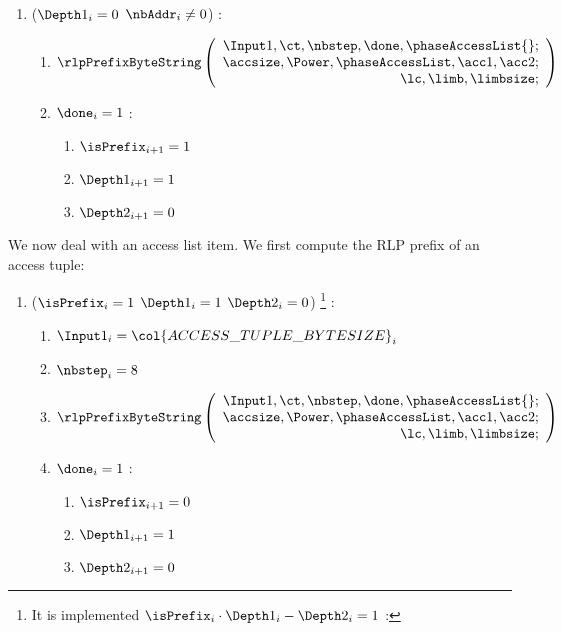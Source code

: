 \begin{enumerate}[resume]
	\item \If ($\Depth 1_{i}=0$ \et $\nbAddr_{i} \neq 0$) \Then:
		\begin{enumerate}
			\item 
				\[
					\rlpPrefixByteString
					\left( \begin{array}{r}
						\Input1,
						\ct,
						\nbstep,
						\done,
						\phaseAccessList{}; \\
						\accsize,
						\Power,
						\phaseAccessList,
						\acc1,
						\acc2; \\
						\lc,
						\limb,
						\limbsize; \\
					\end{array} \right)
				\]
			\item \If $\done_{i}=1$ \Then:
				\begin{enumerate} 
					\item $\isPrefix_{i+1}=1$
					\item $\Depth1_{i+1}=1$
					\item $\Depth2_{i+1}=0$	
				\end{enumerate}
		\end{enumerate}
\end{enumerate}
We now deal with an access list item. We first compute the RLP prefix of an access tuple:
\begin{enumerate}[resume]
	\item \If ($\isPrefix_{i}=1$ \et $\Depth1_{i}=1$ \et $\Depth2_{i}=0$) \footnote{It is implemented \If $\isPrefix_{i} \cdot \Depth1_{i} - \Depth2_{i}=1$ \Then:} \Then:
		\begin{enumerate}
			\item $\Input1_{i} = \col{ACCESS\_TUPLE\_BYTESIZE}_{i}$
			\item $\nbstep_{i}=8$
			\item 
				\[
					\rlpPrefixByteString
					\left( \begin{array}{r}
						\Input1,
						\ct,
						\nbstep,
						\done,
						\phaseAccessList{}; \\
						\accsize,
						\Power,
						\phaseAccessList,
						\acc1,
						\acc2; \\
						\lc,
						\limb,
						\limbsize; \\
					\end{array} \right)
				\]
			\item \If $\done_{i}=1$ \Then:
				\begin{enumerate}
					\item $\isPrefix_{i+1}=0$
					\item $\Depth1_{i+1}=1$
					\item $\Depth2_{i+1}=0$ 
				\end{enumerate}
		\end{enumerate}
\end{enumerate}
